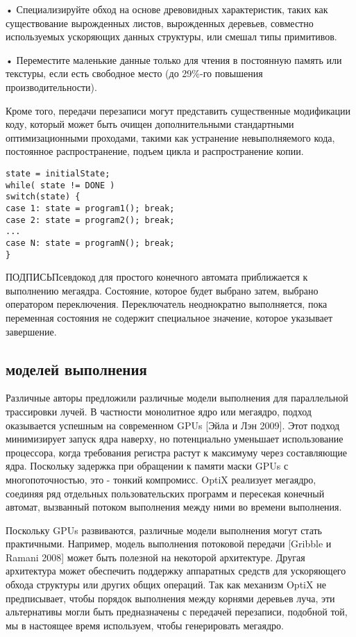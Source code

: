• Специализируйте обход на основе древовидных характеристик, таких как существование вырожденных листов, вырожденных деревьев, совместно используемых ускоряющих данных структуры, или смешал типы примитивов.

• Переместите маленькие данные только для чтения в постоянную память или текстуры, если есть свободное место (до 29\%-го повышения производительности).

Кроме того, передачи перезаписи могут представить существенные модификации коду, который может быть очищен дополнительными стандартными оптимизационными проходами, такими как устранение невыполняемого кода, постоянное распространение, подъем цикла и распространение копии.
\begin{verbatim}
state = initialState;
while( state != DONE )
switch(state) {
case 1: state = program1(); break;
case 2: state = program2(); break;
...
case N: state = programN(); break;
}
\end{verbatim}
ПОДПИСЬПсевдокод для простого конечного автомата приближается к выполнению мегаядра. Состояние, которое будет выбрано затем, выбрано оператором переключения. Переключатель неоднократно выполняется, пока переменная состояния не содержит специальное значение, которое указывает завершение.

\subsection{ моделей выполнения}
Различные авторы предложили различные модели выполнения для параллельной трассировки лучей. В частности монолитное ядро или мегаядро, подход оказывается успешным на современном GPUs [Эйла и Лэн 2009]. Этот подход минимизирует запуск ядра наверху, но потенциально уменьшает использование процессора, когда требования регистра растут к максимуму через составляющие ядра. Поскольку задержка при обращении к памяти маски GPUs с многопоточностью, это - тонкий компромисс.
OptiX реализует мегаядро, соединяя ряд отдельных пользовательских программ и пересекая конечный автомат, вызванный потоком выполнения между ними во времени выполнения.

  Поскольку GPUs развиваются, различные модели выполнения могут стать практичными. Например, модель выполнения потоковой передачи [Gribble и Ramani 2008] может быть полезной на некоторой архитектуре. Другая архитектура может обеспечить поддержку аппаратных средств для ускоряющего обхода структуры или других общих операций. Так как механизм OptiX не предписывает, чтобы порядок выполнения между корнями деревьев луча, эти альтернативы могли быть предназначены с передачей перезаписи, подобной той, мы в настоящее время используем, чтобы генерировать мегаядро.
